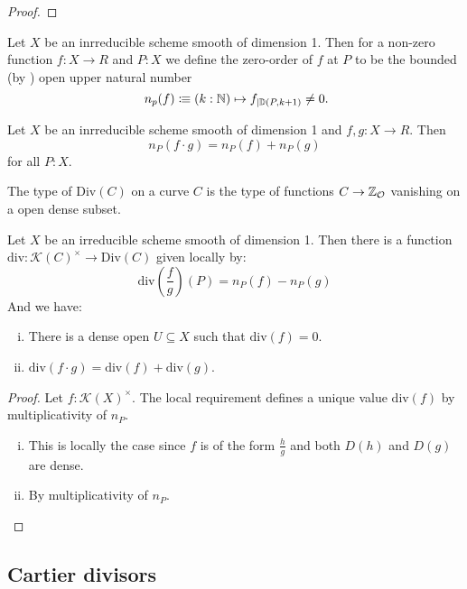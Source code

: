 \begin{proof}
\end{proof}

\begin{definition}
  Let $X$ be an inrreducible scheme smooth of dimension 1.
  Then for a non-zero function $f:X\to R$ and $P:X$ we define the zero-order of $f$ at $P$ to be
  the bounded (by ) open upper natural number
  \[
  n_p(f)\colonequiv (k:\N)\mapsto f_{\mid \D(P,k+1)}\neq 0
  \rlap{.}
  \]
\end{definition}

\begin{lemma}
  Let $X$ be an inrreducible scheme smooth of dimension 1 and $f,g:X\to R$.
  Then
  \[
  n_P(f\cdot g)=n_P( f) + n_P (g)
  \]
  for all $P:X$.
\end{lemma}

\begin{definition}
  The type of  $\mathrm{Div}(C)$ on a curve $C$ is
  the type of functions $C\to \mathbb{Z}_{\mathcal O}$ vanishing on a open dense subset.
\end{definition}

\begin{theorem}
  Let $X$ be an irreducible scheme smooth of dimension 1.
  Then there is a function $\mathrm{div}:\mathcal K(C)^\times \to \mathrm{Div}(C)$ given locally by:
  \[
  \mathrm{div}(\frac{f}{g})(P)=n_P(f)-n_P(g)
  \]
  And we have:
  \begin{enumerate}[(i)]
  \item There is a dense open $U\subseteq X$ such that $\mathrm{div}(f)=0$.
  \item $\mathrm{div}(f\cdot g)=\mathrm{div}(f)+\mathrm{div}(g)$.
  \end{enumerate}
\end{theorem}

\begin{proof}
  Let $f:\mathcal K(X)^\times$.
  The local requirement defines a unique value $\mathrm{div}(f)$ by multiplicativity of $n_P$.
  \begin{enumerate}[(i)]
  \item This is locally the case since $f$ is of the form $\frac{h}{g}$ and both $D(h)$ and $D(g)$ are dense.
  \item By multiplicativity of $n_P$.
  \end{enumerate}
\end{proof}

\subsection{Cartier divisors}
